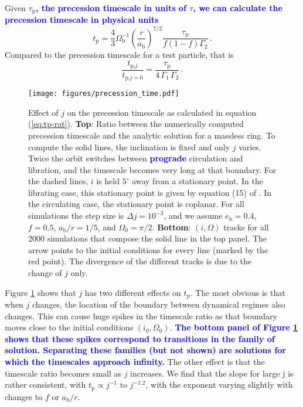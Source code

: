 \documentclass[twocolumn,linenumbers]{aastex631}
\newcommand{\RR}[1]{\textcolor{blue}{\bf#1}} %
\newcommand{\RP}[1]{\RR{#1}} %
\begin{document}
Given \RR{$\tau_\text{p}$, the precession timescale in units of $\tau$, we can calculate the precession timescale in physical units}
\begin{equation}
    \label{eq:tp-j}
    t_\text{p} = \frac{4}{3}\Omega_\text{b}^{-1} \left(\frac{r}{a_\text{b}}\right)^{7/2} \frac{\tau_\text{p}}{f(1-f)\Gamma_2}\, .
\end{equation}
Compared to the precession timescale for a test particle, that is
\begin{equation}
    \label{eq:tp-rat}
    \frac{t_{\text{p,}j}}{t_{\text{p,}j=0}} = \frac{\tau_\text{p}}{4\,\Gamma_1\,\Gamma_2} \, .
\end{equation}

\begin{figure}
    \texttt{[image: figures/precession\_time.pdf]}
    \caption{
        Effect of $j$ on the precession timescale as calculated in equation (\ref{eq:tp-rat}). {\bf Top}: Ratio between the numerically computed precession timescale and the analytic solution for a massless ring. To compute the solid lines, the inclination is fixed and only $j$ varies. Twice the orbit switches between \RP{prograde} circulation and libration, and the timescale becomes very long at that boundary. For the dashed lines, $i$ is held $5^\circ$ away from a stationary point. In the librating case, this stationary point is given by equation (15) of \citet{martin2019}. In the circulating case, the stationary point is coplanar. For all simulations the step size is $\Delta j = 10^{-3}$, and we assume $e_\text{b}=0.4$, $f=0.5$, $a_\text{b}/r = 1/5$, and $\Omega_0 = \pi/2$. {\bf Bottom}: $(i,\Omega)$ tracks for all 2000 simulations that compose the solid line in the top panel. The arrow points to the initial conditions for every line (marked by the red point). The divergence of the different tracks is due to the change of $j$ only.
    }
    \label{fig:t_p}
\end{figure}

Figure \ref{fig:t_p} shows that $j$ has two different effects on $t_\text{p}$. The most obvious is that when $j$ changes, the location of the boundary between dynamical regimes also changes. This can cause huge spikes in the timescale ratio as that boundary moves close to the initial conditions $(i_0, \Omega_0)$. \RR{The bottom panel of Figure \ref{fig:t_p} shows that these spikes correspond to transitions in the family of solution. Separating these families (but not shown) are solutions for which the timescales approach infinity.}
The other effect is that the timescale ratio becomes small as $j$ increases. We find that the slope for large j is rather consistent, with $t_\text{p}\propto j^{-1} \text{ to } j^{-1.2}$, with the exponent varying slightly with changes to $f$ or $a_\text{b}/r$. 
\end{document}
